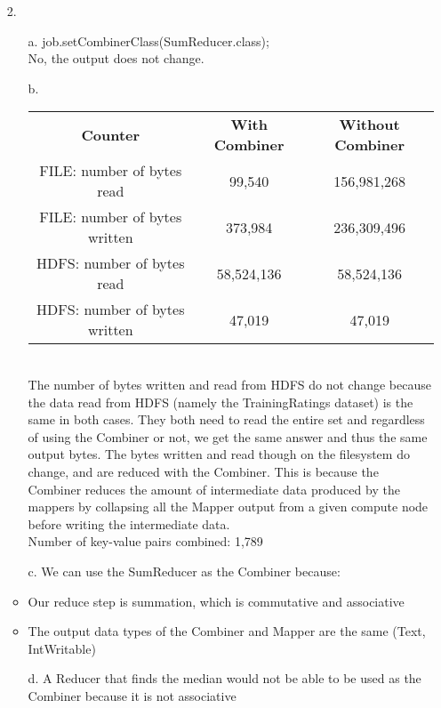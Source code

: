 \documentclass{article}
\begin{document}
\begin{itemize}
\pagebreak
\item[2.]
	\begin{itemize}
		\item[a.] job.setCombinerClass(SumReducer.class);\\
			No, the output does not change.
		\item[b.] 
			\begin{tabular}{|c||c|c|}
				\hline 
				\textbf{Counter} & \textbf{With Combiner} & \textbf{Without Combiner}\\
				FILE: number of bytes read & 99,540 & 156,981,268\\
				FILE: number of bytes written & 373,984 & 236,309,496\\
				HDFS: number of bytes read & 58,524,136 & 58,524,136\\
				HDFS: number of bytes written & 47,019 & 47,019\\
				\hline
			\end{tabular}
		\\		
		The number of bytes written and read from HDFS do not change because the data read from HDFS (namely the TrainingRatings dataset) is the same in both cases. They both need to read the entire set and regardless of using the Combiner or not, we get the same answer and thus the same output bytes. The bytes written and read though on the filesystem do change, and are reduced with the Combiner. This is because the Combiner reduces the amount of intermediate data produced by the mappers by collapsing all the Mapper output from a given compute node before writing the intermediate data.\\
		Number of key-value pairs combined: 1,789 			
		\item[c.] We can use the SumReducer as the Combiner because:
			\item Our reduce step is summation, which is commutative and associative
			\item The output data types of the Combiner and Mapper are the same (Text, IntWritable)
		\item[d.] A Reducer that finds the median would not be able to be used as the Combiner because it is not associative
	
	\end{itemize}

	
\end{itemize}
\end{document}
